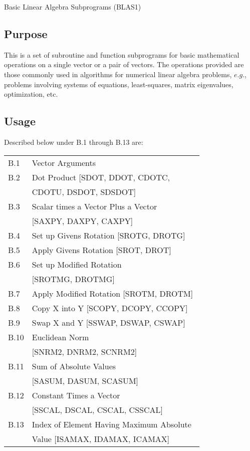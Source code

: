 \documentclass[twoside]{MATH77}
\begin{document}
 Basic Linear Algebra Subprograms (BLAS1)


\subsection{Purpose}

This is a set of subroutine and function subprograms for basic mathematical
operations on a single vector or a pair of vectors. The operations provided
are those commonly used in algorithms for numerical linear algebra problems,
$e.g.$, problems involving systems of equations, least-squares, matrix
eigenvalues, optimization, etc.

\subsection{Usage}

Described below under B.1 through B.13 are:

\begin{tabular*}{3.3in}{@{}l@{~~}l}
B.1 & Vector Arguments \dotfill \pageref{B1}\\
B.2 & Dot Product [SDOT, DDOT, CDOTC,\\
 & CDOTU, DSDOT, SDSDOT] \dotfill \pageref{B2}\\
B.3 & Scalar times a Vector Plus a Vector\\
 & [SAXPY, DAXPY, CAXPY] \dotfill \pageref{B3}\\
B.4 & Set up Givens Rotation [SROTG, DROTG] \dotfill \pageref{B4}\\
B.5 & Apply Givens Rotation [SROT, DROT] \dotfill \pageref{B5}\\
B.6 & Set up Modified Rotation\\
 & [SROTMG, DROTMG] \dotfill \pageref{B6}\\
B.7 & Apply Modified Rotation [SROTM, DROTM] \dotfill \pageref{B7}\\
B.8 & Copy X into Y [SCOPY, DCOPY, CCOPY] \dotfill \pageref{B8}\\
B.9 & Swap X and Y [SSWAP, DSWAP, CSWAP] \dotfill \pageref{B9}\\
B.10 & Euclidean Norm\\
 & [SNRM2, DNRM2, SCNRM2] \dotfill \pageref{B10}\\
B.11 & Sum of Absolute Values\\
 & [SASUM, DASUM, SCASUM] \dotfill \pageref {B11}\\
B.12 & Constant Times a Vector\\
 & [SSCAL, DSCAL, CSCAL, CSSCAL] \dotfill \pageref{B12}\\
B.13 & Index of Element Having Maximum Absolute\quad \quad ~\\
 & Value [ISAMAX, IDAMAX, ICAMAX] \dotfill \pageref{B13}
\end{tabular*}
\end{document}
